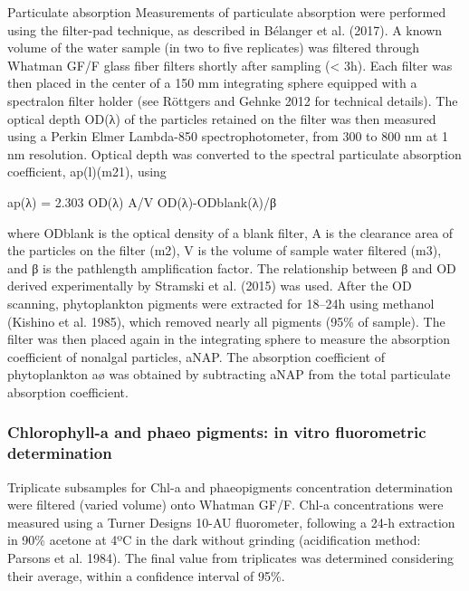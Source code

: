 \documentclass[essd, manuscript]{copernicus}
\begin{document}
Particulate absorption
Measurements of particulate absorption were performed using the filter-pad technique, as described in Bélanger et al. (2017). A known volume of the water sample (in two to five replicates) was filtered through Whatman GF/F glass fiber filters shortly after sampling (< 3h). Each filter was then placed in the center of a 150 mm integrating sphere equipped with a spectralon filter holder (see Röttgers and Gehnke 2012 for technical details). The optical depth OD(λ) of the particles retained on the filter was then measured using a Perkin Elmer Lambda-850 spectrophotometer, from 300 to 800 nm at 1 nm resolution. Optical depth was converted to the spectral particulate absorption coefficient, ap(l)(m21), using

ap(λ) = 2.303 OD(λ) A/V OD(λ)-ODblank(λ)/β

where ODblank is the optical density of a blank filter, A is the clearance area of the particles on the filter (m2), V is the volume of sample water filtered (m3), and β is the pathlength amplification factor. The relationship between β and OD derived experimentally by Stramski et al. (2015) was used. After the OD scanning, phytoplankton pigments were extracted for 18–24h using methanol (Kishino et al. 1985), which removed nearly all pigments (95\% of sample). The filter was then placed again in the integrating sphere to measure the absorption coefficient of nonalgal particles, aNAP. The absorption coefficient of phytoplankton aø was obtained by subtracting aNAP from the total particulate absorption coefficient.

\subsubsection{ Chlorophyll-a and phaeo pigments: in vitro fluorometric determination}
Triplicate subsamples for Chl-a and phaeopigments concentration determination were filtered (varied volume) onto Whatman GF/F. Chl-a concentrations were measured using a Turner Designs 10-AU fluorometer, following a 24-h extraction in 90\% acetone at 4ºC in the dark without grinding (acidification method: Parsons et al. 1984). The final value from triplicates was determined considering their average, within a confidence interval of 95\%.
\end{document}
